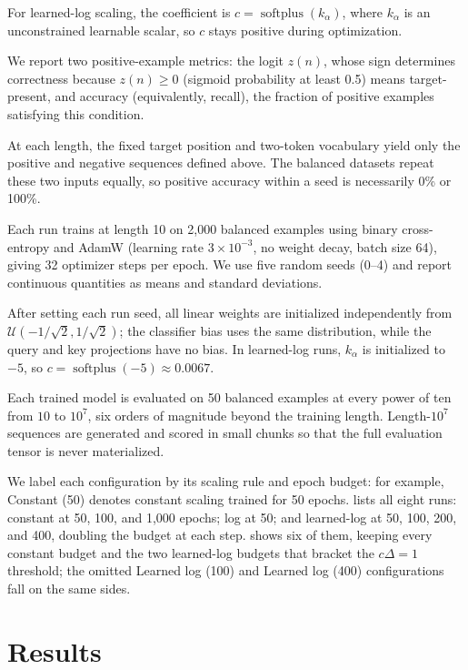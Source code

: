 \documentclass{article}
\begin{document}
For learned-log scaling, the coefficient is
$c=\operatorname{softplus}(k_\alpha)$, where $k_\alpha$ is an unconstrained
learnable scalar, so $c$ stays positive during optimization.

We report two positive-example metrics: the logit $z(n)$, whose sign determines
correctness because $z(n)\geq0$ (sigmoid probability at least 0.5) means
target-present, and accuracy (equivalently, recall), the fraction of positive
examples satisfying this condition.

At each length, the fixed target position and two-token vocabulary yield only
the positive and negative sequences defined above. The balanced datasets repeat
these two inputs equally, so positive accuracy within a seed is necessarily 0\%
or 100\%.

Each run trains at length 10 on 2,000 balanced examples using binary
cross-entropy and AdamW (learning rate $3\times10^{-3}$, no weight decay, batch
size 64), giving 32 optimizer steps per epoch. We use five random seeds (0--4)
and report continuous quantities as means and standard deviations.

After setting each run seed, all linear weights are initialized independently
from $\mathcal U(-1/\sqrt{2},1/\sqrt{2})$; the classifier bias uses the same
distribution, while the query and key projections have no bias. In learned-log
runs, $k_\alpha$ is initialized to $-5$, so
$c=\operatorname{softplus}(-5)\approx0.0067$.

Each trained model is evaluated on 50 balanced examples at every power of ten
from $10$ to $10^7$, six orders of magnitude beyond the training length.
Length-$10^7$ sequences are generated and scored in small chunks so that the
full evaluation tensor is never materialized.

We label each configuration by its scaling rule and epoch budget: for example,
Constant (50) denotes constant scaling trained for 50 epochs.
 lists all eight runs: constant at 50, 100, and 1,000
epochs; log at 50; and learned-log at 50, 100, 200, and 400, doubling the budget
at each step.
 shows six of them, keeping every constant budget
and the two learned-log budgets that bracket the $c\Delta=1$ threshold; the
omitted Learned log (100) and Learned log (400) configurations fall on the same
sides.

\section{Results}
\label{sec:results}
\end{document}
